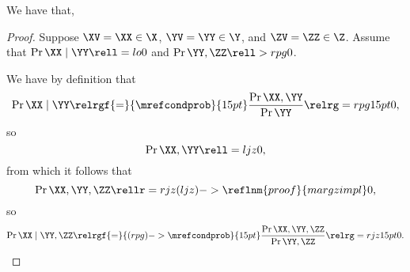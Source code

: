 \begin{proposition}
  We have that, %
\end{proposition}

\begin{proof}
  Suppose 
  $\XV = \XX \in \X$,
  $\YV = \YY \in \Y$, and
  $\ZV = \ZZ \in \Z$. Assume that $\Pr{\XX \mid \YY} \rell = lo 0$ and $\Pr{\YY, \ZZ} \rell > rpg 0$.

  We have by definition that
  $$\Pr{\XX \mid \YY} \relrgf{=}{\mrefcondprob}{15pt} \frac{\Pr{\XX, \YY}}{\Pr{\YY}} \relrg = rpg 15pt 0,$$
  so
  $$\Pr{\XX, \YY} \rell = ljz 0,$$
  from which it follows that
  $$\Pr{\XX, \YY, \ZZ} \rellr = rjz (ljz)->\reflnm{proof}{margzimpl} 0,$$
  so
  $$\Pr{\XX \mid \YY, \ZZ} \relrgf{=}{(rpg)->\mrefcondprob}{15pt} \frac{\Pr{\XX, \YY, \ZZ}}{\Pr{\YY, \ZZ}}
  \relrg = rjz 15pt 0.$$%
\end{proof}
